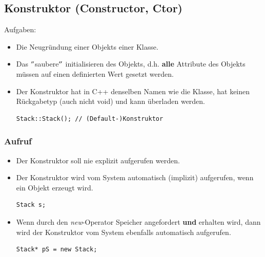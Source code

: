 \subsection{Konstruktor (Constructor, Ctor)}
Aufgaben:
\begin{itemize}
	\item Die Neugründung einer Objekts einer Klasse.
	\item Das $"$saubere$"$ initialisieren des Objekts, d.h. \textbf{alle} Attribute des Objekts müssen auf einen definierten Wert gesetzt werden.
	\item Der Konstruktor hat in C++ denselben Namen wie die Klasse, hat keinen Rückgabetyp (auch nicht void) und kann überladen werden.\\
	\vspace{-\baselineskip}
	\begin{minipage}{0.55\linewidth}
\begin{lstlisting}
Stack::Stack();	// (Default-)Konstruktor
\end{lstlisting}
	\end{minipage}
\end{itemize}

\subsubsection{Aufruf}
\label{sec:aufruf}
\begin{itemize}
	\item Der Konstruktor soll nie explizit aufgerufen werden.
	\item Der Konstruktor wird vom System automatisch (implizit) aufgerufen, wenn ein Objekt erzeugt wird.\\
	\vspace{-\baselineskip}
	\begin{minipage}{0.15\linewidth}
\begin{lstlisting}
Stack s;
\end{lstlisting}
	\end{minipage}
	\item Wenn durch den \emph{new}-Operator Speicher angefordert \textbf{und} erhalten wird, dann wird der Konstruktor vom System ebenfalls automatisch aufgerufen.\\
	\vspace{-\baselineskip}
	\begin{minipage}{0.3\linewidth}
\begin{lstlisting}
Stack* pS = new Stack;
\end{lstlisting}
	\end{minipage}
\end{itemize}

